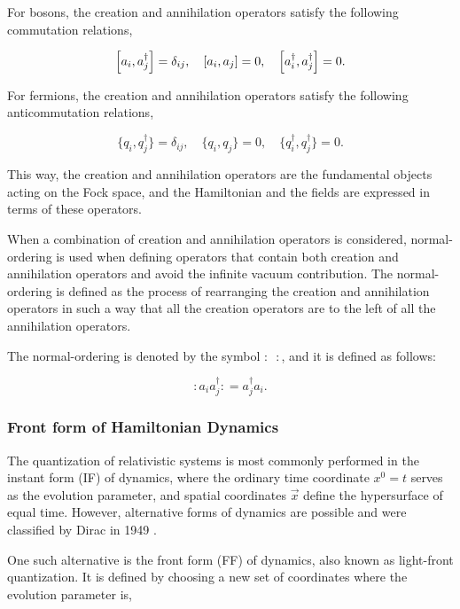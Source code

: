 \documentclass[11pt,a4paper,twoside,pdf]{article}
\numberwithin{equation}{section}
\begin{document}
For bosons, the creation and annihilation operators satisfy the following commutation 
relations,

\begin{equation}
    \left[ a_i, a_j^\dagger \right] = \delta_{ij}, \quad
    \left[ a_i, a_j \right] = 0, \quad
    \left[ a_i^\dagger, a_j^\dagger \right] = 0.
\end{equation}

For fermions, the creation and annihilation operators satisfy the following anticommutation
relations,

\begin{equation}
    \{q_i, q_j^\dagger\} = \delta_{ij}, \quad
    \{q_i, q_j\} = 0, \quad
    \{q_i^\dagger, q_j^\dagger\} = 0.
\end{equation}

This way, the creation and annihilation operators are the fundamental objects acting
on the Fock space, and the Hamiltonian and the fields are expressed in terms of 
these operators.

When a combination of creation and annihilation operators is considered, normal-ordering is
used when defining operators that contain both creation and annihilation operators
and avoid the infinite vacuum contribution. The normal-ordering is defined as the 
process of rearranging the creation and annihilation operators in such a way that 
all the creation operators are to the left of all the annihilation operators.

The normal-ordering is denoted by the symbol $:\,\,\,:$, and it is defined as follows:

\begin{equation}
    :a_i a_j^\dagger: =  a_j^\dagger a_i.
\end{equation}

\subsubsection{Front form of Hamiltonian Dynamics}
The quantization of relativistic systems is most commonly performed in the instant form 
(IF) of dynamics, where the ordinary time coordinate \( x^0 = t \) serves as the evolution 
parameter, and spatial coordinates \( \vec{x} \) define the hypersurface of equal time. 
However, alternative forms of dynamics are possible and were classified by Dirac in 
1949 \cite{dirac_front_forms_1949}.

One such alternative is the front form (FF) of dynamics, also known as light-front 
quantization. It is defined by choosing a new set of coordinates where the evolution 
parameter is,
\end{document}
